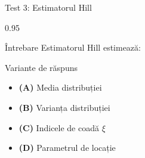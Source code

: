 \documentclass[9pt, aspectratio=169, t]{beamer}
\begin{document}
\begin{frame}{Test 3: Estimatorul Hill}
    \begin{cminipage}{0.95\textwidth}
    \begin{alertblock}{Întrebare}
        Estimatorul Hill estimează:
    \end{alertblock}
    \begin{block}{Variante de răspuns}
    \begin{itemize}\setlength{\itemsep}{0pt}
        \item \textcolor{MainBlue}{\textbf{(A)}} Media distribuției
        \item \textcolor{MainBlue}{\textbf{(B)}} Varianța distribuției
        \item \textcolor{MainBlue}{\textbf{(C)}} Indicele de coadă $\xi$
        \item \textcolor{MainBlue}{\textbf{(D)}} Parametrul de locație
    \end{itemize}
    \end{block}
    \end{cminipage}
\end{frame}
\end{document}
